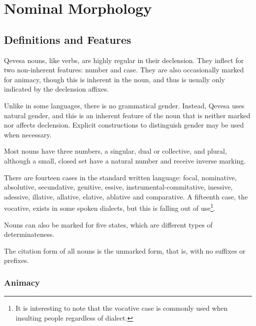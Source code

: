 \documentclass[grammar]{subfiles}
\begin{document}
  \chapter{Nominal Morphology}
  \label{ch:nominal_morphology}

  \section{Definitions and Features}
  \label{sec:nm_definition_features}

  Qevesa nouns, like verbs, are highly regular in their declension. They inflect for two non-inherent features: number and case. They are also occasionally marked for animacy, though this is inherent in the noun, and thus is usually only indicated by the declension affixes. 
  
  Unlike in some languages, there is no grammatical gender. Instead, Qevesa uses natural gender, and this is an inherent feature of the noun that is neither marked nor affects declension. Explicit constructions to distinguish gender may be used when necessary.


  Most nouns have three numbers, a singular, dual or collective, and plural, although a small, closed set have a natural number and receive inverse marking. 

  There are fourteen cases in the standard written language: focal, nominative, absolutive, secundative, genitive, essive, instrumental-commitative, inessive, adessive, illative, allative, elative, ablative and comparative. A fifteenth case, the vocative, exists in some spoken dialects, but this is falling out of use\footnote{It is interesting to note that the vocative case is commonly used when insulting people regardless of dialect.}.

  Nouns can also be marked for five states, which are different types of determinateness.

  The citation form of all nouns is the unmarked form, that is, with no suffixes or prefixes.

  \subsection{Animacy}
  \label{ssec:nm_animacy}
\end{document}
